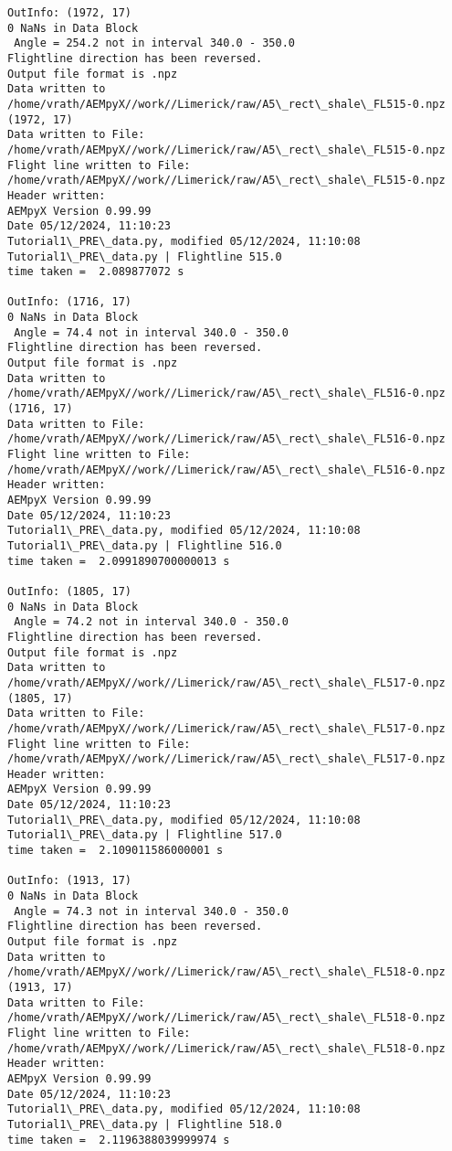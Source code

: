 \documentclass[11pt]{article}
\begin{document}
\begin{Verbatim}[commandchars=\\\{\}]
OutInfo: (1972, 17)
0 NaNs in Data Block
 Angle = 254.2 not in interval 340.0 - 350.0
Flightline direction has been reversed.
Output file format is .npz
Data written to /home/vrath/AEMpyX//work//Limerick/raw/A5\_rect\_shale\_FL515-0.npz
(1972, 17)
Data written to File:
/home/vrath/AEMpyX//work//Limerick/raw/A5\_rect\_shale\_FL515-0.npz
Flight line written to File:
/home/vrath/AEMpyX//work//Limerick/raw/A5\_rect\_shale\_FL515-0.npz
Header written:
AEMpyX Version 0.99.99
Date 05/12/2024, 11:10:23
Tutorial1\_PRE\_data.py, modified 05/12/2024, 11:10:08
Tutorial1\_PRE\_data.py | Flightline 515.0
time taken =  2.089877072 s

OutInfo: (1716, 17)
0 NaNs in Data Block
 Angle = 74.4 not in interval 340.0 - 350.0
Flightline direction has been reversed.
Output file format is .npz
Data written to /home/vrath/AEMpyX//work//Limerick/raw/A5\_rect\_shale\_FL516-0.npz
(1716, 17)
Data written to File:
/home/vrath/AEMpyX//work//Limerick/raw/A5\_rect\_shale\_FL516-0.npz
Flight line written to File:
/home/vrath/AEMpyX//work//Limerick/raw/A5\_rect\_shale\_FL516-0.npz
Header written:
AEMpyX Version 0.99.99
Date 05/12/2024, 11:10:23
Tutorial1\_PRE\_data.py, modified 05/12/2024, 11:10:08
Tutorial1\_PRE\_data.py | Flightline 516.0
time taken =  2.0991890700000013 s

OutInfo: (1805, 17)
0 NaNs in Data Block
 Angle = 74.2 not in interval 340.0 - 350.0
Flightline direction has been reversed.
Output file format is .npz
Data written to /home/vrath/AEMpyX//work//Limerick/raw/A5\_rect\_shale\_FL517-0.npz
(1805, 17)
Data written to File:
/home/vrath/AEMpyX//work//Limerick/raw/A5\_rect\_shale\_FL517-0.npz
Flight line written to File:
/home/vrath/AEMpyX//work//Limerick/raw/A5\_rect\_shale\_FL517-0.npz
Header written:
AEMpyX Version 0.99.99
Date 05/12/2024, 11:10:23
Tutorial1\_PRE\_data.py, modified 05/12/2024, 11:10:08
Tutorial1\_PRE\_data.py | Flightline 517.0
time taken =  2.109011586000001 s

OutInfo: (1913, 17)
0 NaNs in Data Block
 Angle = 74.3 not in interval 340.0 - 350.0
Flightline direction has been reversed.
Output file format is .npz
Data written to /home/vrath/AEMpyX//work//Limerick/raw/A5\_rect\_shale\_FL518-0.npz
(1913, 17)
Data written to File:
/home/vrath/AEMpyX//work//Limerick/raw/A5\_rect\_shale\_FL518-0.npz
Flight line written to File:
/home/vrath/AEMpyX//work//Limerick/raw/A5\_rect\_shale\_FL518-0.npz
Header written:
AEMpyX Version 0.99.99
Date 05/12/2024, 11:10:23
Tutorial1\_PRE\_data.py, modified 05/12/2024, 11:10:08
Tutorial1\_PRE\_data.py | Flightline 518.0
time taken =  2.1196388039999974 s


\end{Verbatim}
\end{document}
